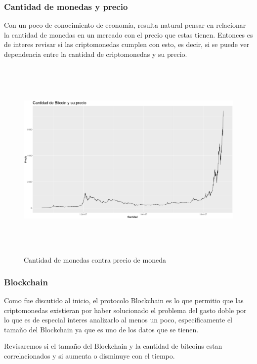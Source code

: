 \documentclass[12pt,letterpaper]{article}
\begin{document}
    \subsubsection*{Cantidad de monedas y precio}

    Con un poco de conocimiento de economía, resulta natural pensar en relacionar la cantidad de monedas en un mercado con el precio que estas tienen. Entonces es de interes revisar si las criptomonedas cumplen con esto, es decir, si se puede ver dependencia entre la cantidad de criptomonedas y su precio.

    \begin{figure}
        \centering

        \includegraphics[width = 18cm, height = 10cm]{btc/cantidad_vs_precio}

        \caption{Cantidad de monedas contra precio de moneda}
    \end{figure}

    \subsubsection*{Blockchain}

    Como fue discutido al inicio, el protocolo Blockchain es lo que permitio que las criptomonedas existieran por haber solucionado el problema del gasto doble por lo que es de especial interes analizarlo al menos un poco, especificamente el tamaño del Blockchain ya que es uno de los datos que se tienen.

    Revisaremos si el tamaño del Blockchain y la cantidad de bitcoins estan correlacionados y si aumenta o disminuye con el tiempo.
\end{document}
